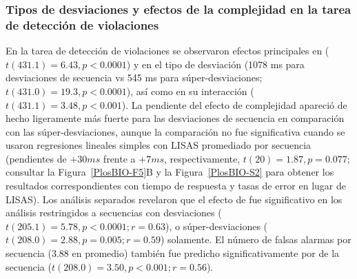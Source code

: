 \subsubsection*{Tipos de desviaciones y efectos de la complejidad en la tarea de detección de violaciones}


En la tarea de detección de violaciones se observaron efectos principales en \mdlbin ($t (431.1) = 6.43, p < 0.0001$) y en el tipo de desviación (1078 ms para desviaciones de secuencia vs 545 ms para súper-desviaciones; $t (431.0) = 19.3, p < 0.0001$), así como en su interacción ($t (431.1) = 3.48, p < 0.001$). La pendiente del efecto de complejidad apareció de hecho ligeramente más fuerte para las desviaciones de secuencia en comparación con las súper-desviaciones, aunque la comparación no fue significativa cuando se usaron regresiones lineales simples con LISAS promediado por secuencia (pendientes de $+30ms$ frente a $+7ms$, respectivamente, $t (20) = 1.87, p = 0.077$; consultar la Figura~\ref{PlosBIO-F5}B y la Figura~\ref{PlosBIO-S2} para obtener los resultados correspondientes con tiempo de respuesta y tasas de error en lugar de LISAS). Los análisis separados revelaron que el efecto de \mdlbin fue significativo en los análisis restringidos a secuencias con desviaciones ($t (205.1) = 5.78, p < 0.0001; r = 0.63$), o súper-desviaciones ($t (208.0) = 2.88, p = 0.005; r = 0.59$) solamente. El número de falsas alarmas por secuencia ($3.88$ en promedio) también fue predicho significativamente por \mdlbin de la secuencia ($t (208.0) = 3.50, p < 0.001; r = 0.56$).

